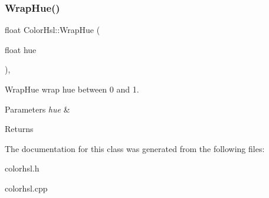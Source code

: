 \subsubsection{\texorpdfstring{Wrap\+Hue()}{WrapHue()}}
{\footnotesize\ttfamily float Color\+Hsl\+::\+Wrap\+Hue (\begin{DoxyParamCaption}\item[{float}]{hue }\end{DoxyParamCaption})\hspace{0.3cm}{\ttfamily [static]}, {\ttfamily [protected]}}



Wrap\+Hue wrap hue between 0 and 1. 


\begin{DoxyParams}{Parameters}
{\em hue} & \\
\hline
\end{DoxyParams}
\begin{DoxyReturn}{Returns}

\end{DoxyReturn}


The documentation for this class was generated from the following files\+:\begin{DoxyCompactItemize}
\item 
colorhsl.\+h\item 
colorhsl.\+cpp\end{DoxyCompactItemize}
